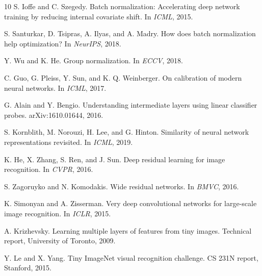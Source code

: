 \documentclass[11pt]{article}
\begin{document}

\begin{thebibliography}{10}
S. Ioffe and C. Szegedy.
\newblock Batch normalization: Accelerating deep network training by reducing internal covariate shift.
\newblock In \emph{ICML}, 2015.

S. Santurkar, D. Tsipras, A. Ilyas, and A. Madry.
\newblock How does batch normalization help optimization?
\newblock In \emph{NeurIPS}, 2018.

Y. Wu and K. He.
\newblock Group normalization.
\newblock In \emph{ECCV}, 2018.

C. Guo, G. Pleiss, Y. Sun, and K. Q. Weinberger.
\newblock On calibration of modern neural networks.
\newblock In \emph{ICML}, 2017.

G. Alain and Y. Bengio.
\newblock Understanding intermediate layers using linear classifier probes.
\newblock arXiv:1610.01644, 2016.

S. Kornblith, M. Norouzi, H. Lee, and G. Hinton.
\newblock Similarity of neural network representations revisited.
\newblock In \emph{ICML}, 2019.

K. He, X. Zhang, S. Ren, and J. Sun.
\newblock Deep residual learning for image recognition.
\newblock In \emph{CVPR}, 2016.

S. Zagoruyko and N. Komodakis.
\newblock Wide residual networks.
\newblock In \emph{BMVC}, 2016.

K. Simonyan and A. Zisserman.
\newblock Very deep convolutional networks for large-scale image recognition.
\newblock In \emph{ICLR}, 2015.

A. Krizhevsky.
\newblock Learning multiple layers of features from tiny images.
\newblock Technical report, University of Toronto, 2009.

Y. Le and X. Yang.
\newblock Tiny ImageNet visual recognition challenge.
\newblock CS 231N report, Stanford, 2015.

\end{thebibliography}
\end{document}
